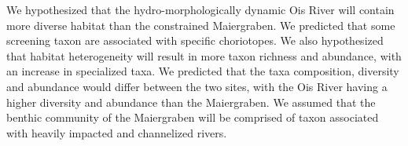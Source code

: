 We hypothesized that the hydro-morphologically dynamic Ois River will contain more diverse habitat than the constrained Maiergraben. We predicted that some screening taxon are associated with specific choriotopes. We also hypothesized that habitat heterogeneity will result in more taxon richness and abundance, with an increase in specialized taxa. We predicted that the taxa composition, diversity and abundance would differ between the two sites, with the Ois River having a higher diversity and abundance than the Maiergraben. We assumed that the benthic community of the Maiergraben will be comprised of taxon associated with heavily impacted and channelized rivers.


